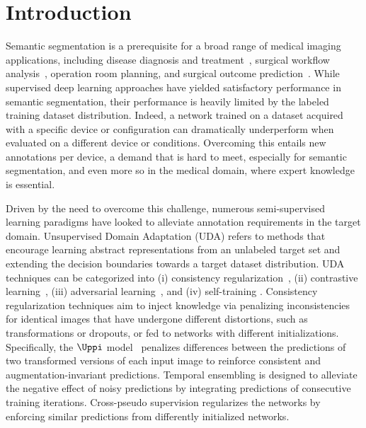 \section{Introduction}
\label{sec:tist_introduction}

Semantic segmentation is a prerequisite for a broad range of medical imaging applications, including disease diagnosis and treatment~, surgical workflow analysis~, operation room planning, and surgical outcome prediction~. While supervised deep learning approaches have yielded satisfactory performance in semantic segmentation, their performance is heavily limited by the labeled training dataset distribution. Indeed, a network trained on a dataset acquired with a specific device or configuration can dramatically underperform when evaluated on a different device or conditions. Overcoming this entails new annotations per device, a demand that is hard to meet, especially for semantic segmentation, and even more so in the medical domain, where expert knowledge is essential.

Driven by the need to overcome this challenge, numerous semi-supervised learning paradigms have looked to alleviate annotation requirements in the target domain. Unsupervised Domain Adaptation (UDA) refers to methods that encourage learning abstract representations from an unlabeled target set and extending the decision boundaries towards a target dataset distribution. UDA techniques can be categorized into (i) consistency regularization~, (ii) contrastive learning~, (iii) adversarial learning~, and (iv) self-training . Consistency regularization techniques aim to inject knowledge via penalizing inconsistencies for identical images that have undergone different distortions, such as transformations or dropouts, or fed to networks with different initializations. Specifically, the $\Uppi$ model~ penalizes differences between the predictions of two transformed versions of each input image to reinforce consistent and augmentation-invariant predictions. Temporal ensembling is designed to alleviate the negative effect of noisy predictions by integrating predictions of consecutive training iterations. Cross-pseudo supervision regularizes the networks by enforcing similar predictions from differently initialized networks. 

